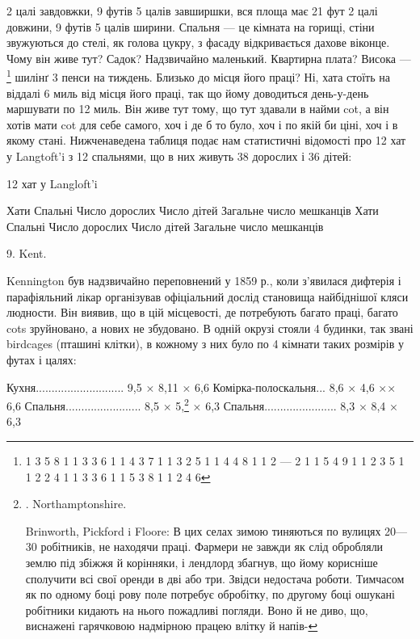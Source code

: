 \parcont{}  %
2 цалі завдовжки, 9 футів 5 цалів завширшки, вся площа має
21 фут 2 цалі довжини, 9 футів 5 цалів ширини. Спальня — це
кімната на горищі, стіни звужуються до стелі, як голова цукру,
з фасаду відкривається дахове віконце. Чому він живе тут?
Садок? Надзвичайно маленький. Квартирна плата? Висока —\footnote{
1    3    5    8    1    1    3    3    6
1    1    4    3    7    1    1    3    2    5
1    1    4    4    8    1    1    2    —   2
1    1    5    4    9    1    1    2    3    5
1    1    2    2    4    1    1    3    3    6
1    1    5    3    8    1    1    2    4    6
} шилінґ 3 пенси на тиждень. Близько до місця його праці?
Ні, хата стоїть на віддалі 6 миль від місця його праці, так що
йому доводиться день-у-день маршувати по 12 миль. Він живе
тут тому, що тут здавали в найми cot, а він хотів мати cot для
себе самого, хоч і де б то було, хоч і по якій би ціні, хоч і в якому
стані. Нижченаведена таблиця подає нам статистичні відомості
про 12 хат у Langtoft’i з 12 спальнями, що в них живуть 38 дорослих
і 36 дітей:

12 хат у Langloft’i

Хати   Спальні  Число дорослих    Число дітей    Загальне число мешканців    Хати    Спальні
Число дорослих    Число дітей    Загальне число мешканців

9. Kent.

Kennington був надзвичайно переповнений у 1859 р., коли
з’явилася дифтерія і парафіяльний лікар організував офіціальний
дослід становища найбіднішої кляси людности. Він виявив, що
в цій місцевості, де потребують багато праці, багато cots зруйновано,
а нових не збудовано. В одній окрузі стояли 4 будинки,
так звані birdcages (пташині клітки), в кожному з них було по
4 кімнати таких розмірів у футах і цалях:

Кухня............................     9,5 × 8,11 × 6,6
Комірка-полоскальня...      8,6 × 4,6 ×× 6,6
Спальня........................     8,5 × 5,\footnote{
. Northamptonshire.

Brinworth, Pickford i Floore: В цих селах зимою тиняються
по вулицях 20—30 робітників, не находячи праці. Фармери не
завжди як слід обробляли землю під збіжжя й корінняки, і лендлорд
збагнув, що йому корисніше сполучити всі свої оренди
в дві або три. Звідси недостача роботи. Тимчасом як по одному
боці рову поле потребує обробітку, по другому боці ошукані
робітники кидають на нього пожадливі погляди. Воно й не диво,
що, виснажені гарячковою надмірною працею влітку й напів-
} × 6,3
Спальня.......................      8,3 × 8,4 × 6,3
\parbreak{}  %
